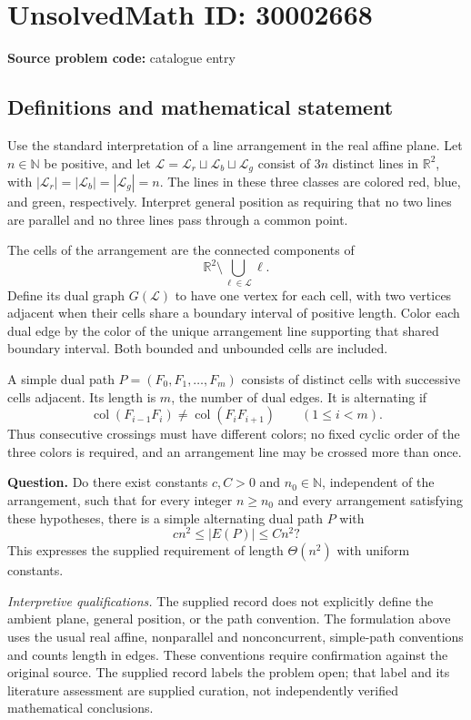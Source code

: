 \documentclass[11pt]{article}
\newcommand{\N}{\mathbb{N}}
\newcommand{\R}{\mathbb{R}}
\begin{document}
\section*{UnsolvedMath ID: 30002668}
\textbf{Source problem code:} catalogue entry
\subsection{Definitions and mathematical statement}
Use the standard interpretation of a line arrangement in the real affine plane. Let \(n\in\N\) be positive, and let \(\mathcal L=\mathcal L_r\sqcup\mathcal L_b\sqcup\mathcal L_g\) consist of \(3n\) distinct lines in \(\R^2\), with \(|\mathcal L_r|=|\mathcal L_b|=|\mathcal L_g|=n\). The lines in these three classes are colored red, blue, and green, respectively. Interpret general position as requiring that no two lines are parallel and no three lines pass through a common point.

The cells of the arrangement are the connected components of
\[
\R^2\setminus\bigcup_{\ell\in\mathcal L}\ell.
\]
Define its dual graph \(G(\mathcal L)\) to have one vertex for each cell, with two vertices adjacent when their cells share a boundary interval of positive length. Color each dual edge by the color of the unique arrangement line supporting that shared boundary interval. Both bounded and unbounded cells are included.

A simple dual path \(P=(F_0,F_1,\ldots,F_m)\) consists of distinct cells with successive cells adjacent. Its length is \(m\), the number of dual edges. It is alternating if
\[
\operatorname{col}(F_{i-1}F_i)\ne\operatorname{col}(F_iF_{i+1})
\qquad(1\le i<m).
\]
Thus consecutive crossings must have different colors; no fixed cyclic order of the three colors is required, and an arrangement line may be crossed more than once.

\textbf{Question.} Do there exist constants \(c,C>0\) and \(n_0\in\N\), independent of the arrangement, such that for every integer \(n\ge n_0\) and every arrangement satisfying these hypotheses, there is a simple alternating dual path \(P\) with
\[
cn^2\le |E(P)|\le Cn^2?
\]
This expresses the supplied requirement of length \(\Theta(n^2)\) with uniform constants.

\textit{Interpretive qualifications.} The supplied record does not explicitly define the ambient plane, general position, or the path convention. The formulation above uses the usual real affine, nonparallel and nonconcurrent, simple-path conventions and counts length in edges. These conventions require confirmation against the original source. The supplied record labels the problem open; that label and its literature assessment are supplied curation, not independently verified mathematical conclusions.
\end{document}
